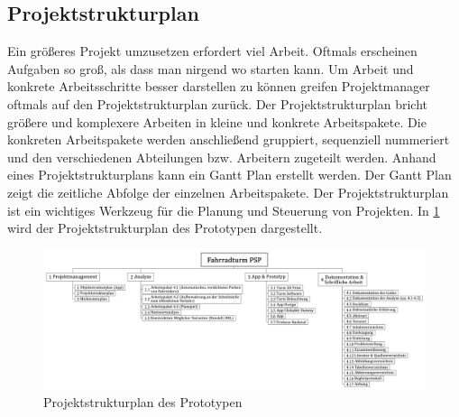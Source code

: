 \subsection{Projektstrukturplan}

Ein größeres Projekt umzusetzen erfordert viel Arbeit. Oftmals erscheinen Aufgaben so groß, als dass man nirgend wo starten kann. Um Arbeit und konkrete Arbeitsschritte besser darstellen zu können greifen Projektmanager oftmals auf den Projektstrukturplan zurück. Der Projektstrukturplan bricht größere und komplexere Arbeiten in kleine und konkrete Arbeitspakete. Die konkreten Arbeitspakete werden anschließend gruppiert, sequenziell nummeriert und den verschiedenen Abteilungen bzw. Arbeitern zugeteilt werden. Anhand eines Projektstrukturplans kann ein Gantt Plan erstellt werden. Der Gantt Plan zeigt die zeitliche Abfolge der einzelnen Arbeitspakete. Der Projektstrukturplan ist ein wichtiges Werkzeug für die Planung und Steuerung von Projekten. In \ref{fig:projektstrukturplan} wird der Projektstrukturplan des Prototypen dargestellt.

\begin{figure}[ht]
  \centering
  \includegraphics[width=1\textwidth]{images/projektstrukturplan}
  \caption{Projektstrukturplan des Prototypen}
  \label{fig:projektstrukturplan}
\end{figure}
